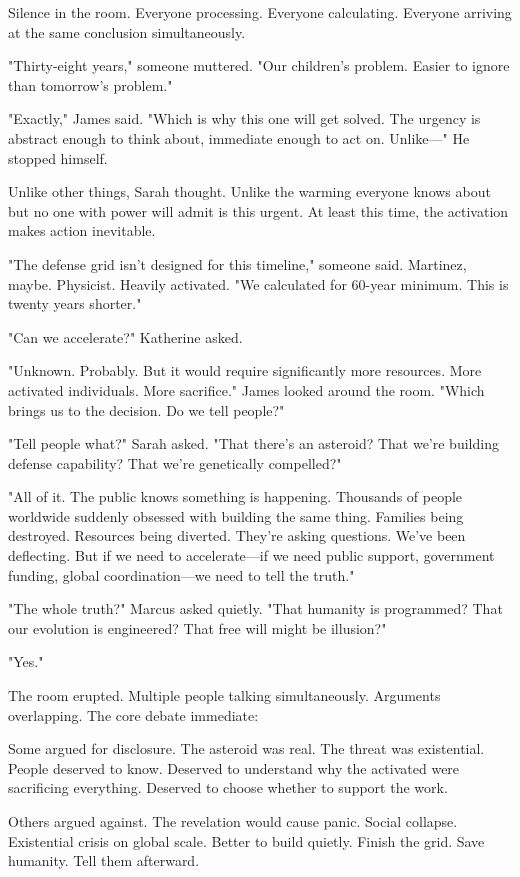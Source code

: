 Silence in the room. Everyone processing. Everyone calculating. Everyone arriving at the same conclusion simultaneously.

"Thirty-eight years," someone muttered. "Our children's problem. Easier to ignore than tomorrow's problem."

"Exactly," James said. "Which is why this one will get solved. The urgency is abstract enough to think about, immediate enough to act on. Unlike—" He stopped himself.

Unlike other things, Sarah thought. Unlike the warming everyone knows about but no one with power will admit is this urgent. At least this time, the activation makes action inevitable.

"The defense grid isn't designed for this timeline," someone said. Martinez, maybe. Physicist. Heavily activated. "We calculated for 60-year minimum. This is twenty years shorter."

"Can we accelerate?" Katherine asked.

"Unknown. Probably. But it would require significantly more resources. More activated individuals. More sacrifice." James looked around the room. "Which brings us to the decision. Do we tell people?"

"Tell people what?" Sarah asked. "That there's an asteroid? That we're building defense capability? That we're genetically compelled?"

"All of it. The public knows something is happening. Thousands of people worldwide suddenly obsessed with building the same thing. Families being destroyed. Resources being diverted. They're asking questions. We've been deflecting. But if we need to accelerate—if we need public support, government funding, global coordination—we need to tell the truth."

"The whole truth?" Marcus asked quietly. "That humanity is programmed? That our evolution is engineered? That free will might be illusion?"

"Yes."

The room erupted. Multiple people talking simultaneously. Arguments overlapping. The core debate immediate:

Some argued for disclosure. The asteroid was real. The threat was existential. People deserved to know. Deserved to understand why the activated were sacrificing everything. Deserved to choose whether to support the work.

Others argued against. The revelation would cause panic. Social collapse. Existential crisis on global scale. Better to build quietly. Finish the grid. Save humanity. Tell them afterward.

